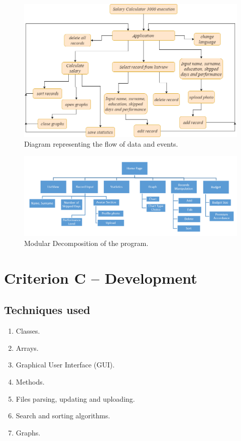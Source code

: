 \documentclass[a4]{article}
\begin{document}
\begin{figure}[ht]
\begin{center}
  \includegraphics[width=\textwidth]{flow.png}
  \caption{Diagram representing the flow of data and events.}
  \label{fig:flow}
\end{center}
\end{figure}

\begin{figure}[ht]
\begin{center}
  \includegraphics[width=\textwidth]{modular.png}
  \caption{Modular Decomposition of the program.}
  \label{fig:modular}
\end{center}
\end{figure}

\newpage

\section{Criterion C – Development}

\subsection{Techniques used}

\begin{enumerate}
    \item Classes.
    \item Arrays.
    \item Graphical User Interface (GUI).
    \item Methods.
    \item Files parsing, updating and uploading.
    \item Search and sorting algorithms.
    \item Graphs.

\end{enumerate}
\end{document}

